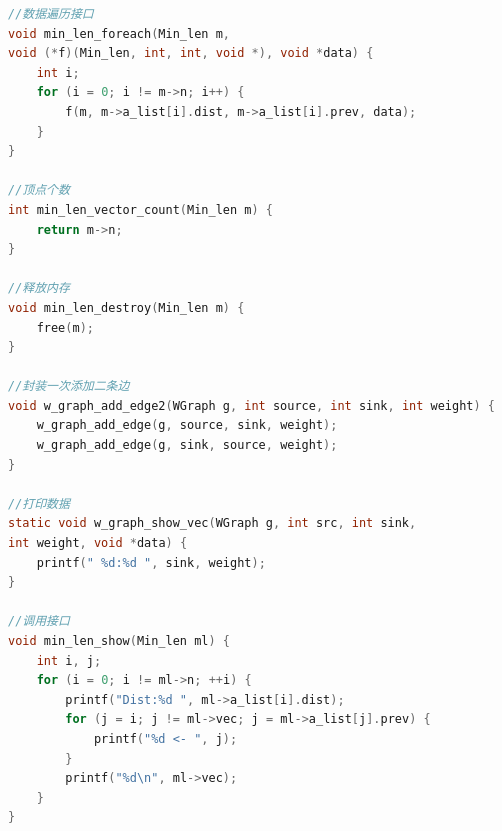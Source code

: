 \documentclass[a4paper,10pt]{ctexart}
\begin{document}
\begin{lstlisting}[language={C}]
//数据遍历接口
void min_len_foreach(Min_len m, 
void (*f)(Min_len, int, int, void *), void *data) {
    int i;
    for (i = 0; i != m->n; i++) {
        f(m, m->a_list[i].dist, m->a_list[i].prev, data);
    }
}

//顶点个数
int min_len_vector_count(Min_len m) {
    return m->n;
}

//释放内存
void min_len_destroy(Min_len m) {
    free(m);
}

//封装一次添加二条边
void w_graph_add_edge2(WGraph g, int source, int sink, int weight) {
    w_graph_add_edge(g, source, sink, weight);
    w_graph_add_edge(g, sink, source, weight);
}

//打印数据
static void w_graph_show_vec(WGraph g, int src, int sink, 
int weight, void *data) {
    printf(" %d:%d ", sink, weight);
}

//调用接口
void min_len_show(Min_len ml) {
    int i, j;
    for (i = 0; i != ml->n; ++i) {
        printf("Dist:%d ", ml->a_list[i].dist);
        for (j = i; j != ml->vec; j = ml->a_list[j].prev) {
            printf("%d <- ", j);
        }
        printf("%d\n", ml->vec);
    }
}
\end{lstlisting}
\end{document}
